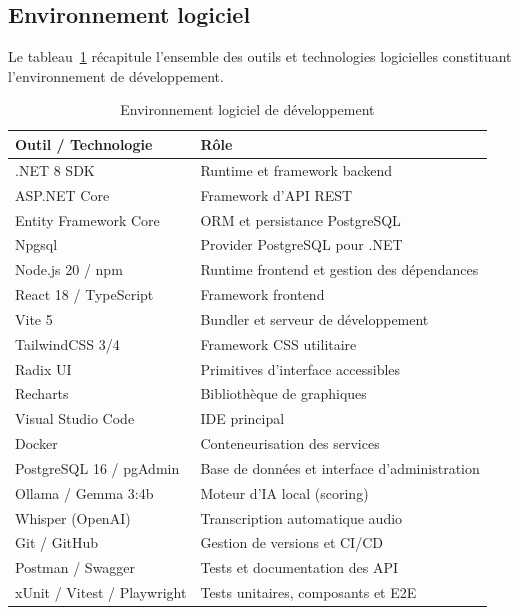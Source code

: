 \subsection{Environnement logiciel}

\noindent Le tableau~\ref{tab:env_logiciel} récapitule l'ensemble des outils et
technologies logicielles constituant l'environnement de développement.

\begin{table}[H]
    \centering
    \caption{Environnement logiciel de développement}
    \label{tab:env_logiciel}
    \renewcommand{\arraystretch}{1.3}
    \begin{tabular}{|l|l|}
        \hline
        \textbf{Outil / Technologie} & \textbf{Rôle} \\
        \hline
        .NET 8 SDK & Runtime et framework backend \\
        \hline
        ASP.NET Core & Framework d'API REST \\
        \hline
        Entity Framework Core & ORM et persistance PostgreSQL \\
        \hline
        Npgsql & Provider PostgreSQL pour .NET \\
        \hline
        Node.js 20 / npm & Runtime frontend et gestion des dépendances \\
        \hline
        React 18 / TypeScript & Framework frontend \\
        \hline
        Vite 5 & Bundler et serveur de développement \\
        \hline
        TailwindCSS 3/4 & Framework CSS utilitaire \\
        \hline
        Radix UI & Primitives d'interface accessibles \\
        \hline
        Recharts & Bibliothèque de graphiques \\
        \hline
        Visual Studio Code & IDE principal \\
        \hline
        Docker & Conteneurisation des services \\
        \hline
        PostgreSQL 16 / pgAdmin & Base de données et interface d'administration \\
        \hline
        Ollama / Gemma 3:4b & Moteur d'IA local (scoring) \\
        \hline
        Whisper (OpenAI) & Transcription automatique audio \\
        \hline
        Git / GitHub & Gestion de versions et CI/CD \\
        \hline
        Postman / Swagger & Tests et documentation des API \\
        \hline
        xUnit / Vitest / Playwright & Tests unitaires, composants et E2E \\
        \hline
    \end{tabular}
\end{table}


